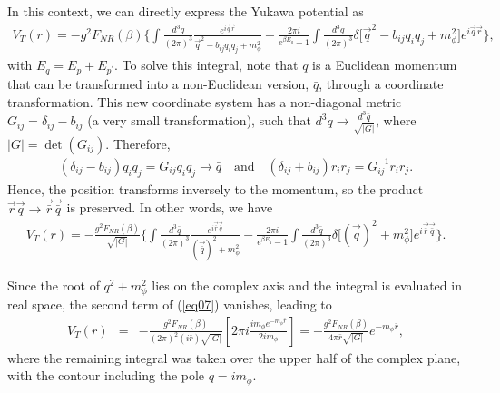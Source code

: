 \documentclass[11pt,showpacs,preprintnumbers,amsmath,amssymb,prd,nofootinbib,superscriptaddress]{revtex4-2}
\begin{document}
In this context, we can directly express the Yukawa potential as
\begin{eqnarray}
    V_T(r)=-g^2F_{NR}(\beta)\biggl\{\int\frac{d^3q}{(2\pi)^3}\frac{e^{i\vec{q}\vec{r}}}{\vec{q}^2-b_{ij}q_iq_j+m_\phi^2}-\frac{2\pi i}{e^{\beta E_q}-1}\int\frac{d^3q}{(2\pi)^3}\delta\biggl[\vec{q}^2-b_{ij}q_iq_j+m_\phi^2\biggr]e^{i\vec{q}\vec{r}}\biggr\},
\end{eqnarray}
with $E_q=E_p+E_{p^\prime}$. To solve this integral, note that $q$ is a Euclidean momentum that can be transformed into a non-Euclidean version, $\bar{q}$, through a coordinate transformation. This new coordinate system has a non-diagonal metric $G_{ij}=\delta_{ij}-b_{ij}$ (a very small transformation), such that $d^3q \to \frac{d^{3}\bar{q}}{\sqrt{|G|}}$, where $|G|=\det(G_{ij})$. Therefore,
\begin{eqnarray}
(\delta_{ij}-b_{ij})q_iq_j=G_{ij}q_iq_j\to\bar{q}\quad \mbox{and}\quad (\delta_{ij}+b_{ij})r_ir_j=G_{ij}^{-1}r_ir_j.
\end{eqnarray}
Hence, the position transforms inversely to the momentum, so the product $\vec{r}\vec{q} \to \vec{\bar{r}}\vec{\bar{q}}$ is preserved. In other words, we have
\begin{eqnarray}
    V_T(r)=-\frac{g^2F_{NR}(\beta)}{\sqrt{|G|}}\biggl\{\int\frac{d^3\bar{q}}{(2\pi)^3}\frac{e^{i\vec{\bar{r}}\vec{\bar{q}}}}{(\vec{\bar{q}})^2+m_\phi^2}-\frac{2\pi i}{e^{\beta E_q}-1}\int\frac{d^3\bar{q}}{(2\pi)^3}\delta\biggl[(\vec{\bar{q}})^2+m_\phi^2\biggr]e^{i\vec{\bar{r}}\vec{\bar{q}}}\biggr\}.\label{eq07}
\end{eqnarray}

Since the root of $q^2 + m_{\phi}^2$ lies on the complex axis and the integral is evaluated in real space, the second term of (\ref{eq07}) vanishes, leading to
\begin{eqnarray}
    V_T(r)&=&%
    -\frac{g^2F_{NR}(\beta)}{(2\pi)^2(i\bar{r})\sqrt{|G|}}\left[2\pi i\frac{im_\phi e^{-m_\phi \bar{r}}}{2im_\phi}\right]=-\frac{g^2F_{NR}(\beta)}{4\pi\bar{r}\sqrt{|G|}}e^{-m_\phi\bar{r}},
\end{eqnarray}
where the remaining integral was taken over the upper half of the complex plane, with the contour including the pole $q = i m_\phi$.
\end{document}
